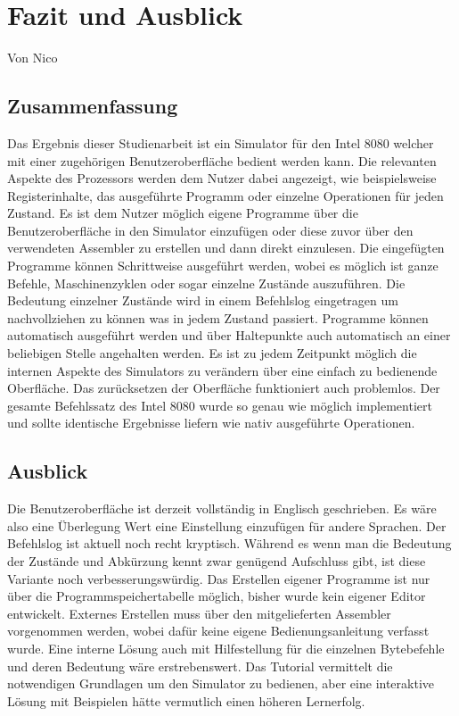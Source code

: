 \documentclass[12pt]{article}
\begin{document}
\section{Fazit und Ausblick}
Von Nico \\

\noindent
\subsection{Zusammenfassung}
Das Ergebnis dieser Studienarbeit ist ein Simulator für den Intel 8080 welcher mit einer zugehörigen Benutzeroberfläche bedient werden kann. Die relevanten Aspekte des Prozessors werden dem Nutzer dabei angezeigt, wie beispielsweise Registerinhalte, das ausgeführte Programm oder einzelne Operationen für jeden Zustand. Es ist dem Nutzer möglich eigene Programme über die Benutzeroberfläche in den Simulator einzufügen oder diese zuvor über den verwendeten Assembler zu erstellen und dann direkt einzulesen. Die eingefügten Programme können Schrittweise ausgeführt werden, wobei es möglich ist ganze Befehle, Maschinenzyklen oder sogar einzelne Zustände auszuführen. Die Bedeutung einzelner Zustände wird in einem Befehlslog eingetragen um nachvollziehen zu können was in jedem Zustand passiert. Programme können automatisch ausgeführt werden und über Haltepunkte auch automatisch an einer beliebigen Stelle angehalten werden. Es ist zu jedem Zeitpunkt möglich die internen Aspekte des Simulators zu verändern über eine einfach zu bedienende Oberfläche. Das zurücksetzen der Oberfläche funktioniert auch problemlos. Der gesamte Befehlssatz des Intel 8080 wurde so genau wie möglich implementiert und sollte identische Ergebnisse liefern wie nativ ausgeführte Operationen.

\subsection{Ausblick}
Die Benutzeroberfläche ist derzeit vollständig in Englisch geschrieben. Es wäre also eine Überlegung Wert eine Einstellung einzufügen für andere Sprachen. Der Befehlslog ist aktuell noch recht kryptisch. Während es wenn man die Bedeutung der Zustände und Abkürzung kennt zwar genügend Aufschluss gibt, ist diese Variante noch verbesserungswürdig. Das Erstellen eigener Programme ist nur über die Programmspeichertabelle möglich, bisher wurde kein eigener Editor entwickelt. Externes Erstellen muss über den mitgelieferten Assembler vorgenommen werden, wobei dafür keine eigene Bedienungsanleitung verfasst wurde. Eine interne Lösung auch mit Hilfestellung für die einzelnen Bytebefehle und deren Bedeutung wäre erstrebenswert. Das Tutorial vermittelt die notwendigen Grundlagen um den Simulator zu bedienen, aber eine interaktive Lösung mit Beispielen hätte vermutlich einen höheren Lernerfolg.
\end{document}
